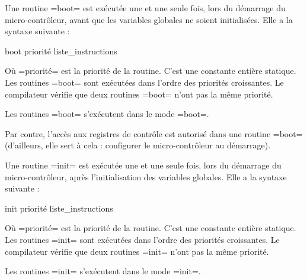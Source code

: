 
Une routine \plm=boot= est exécutée une et une seule fois, lors du démarrage du micro-contrôleur, avant que les variables globales ne soient initialisées. Elle a la syntaxe suivante :
\begin{PLM}
boot priorité {
  liste_instructions
}
\end{PLM}
Où \plm=priorité= est la priorité de la routine. C'est une constante entière statique. Les routines \plm=boot= sont exécutées dans l'ordre des priorités croissantes. Le compilateur vérifie que deux routines \plm=boot= n'ont pas la même priorité.

Les routines \plm=boot= s'exécutent dans le mode \plm=boot=.


Par contre, l'accès aux registres de contrôle est autorisé dans une routine \plm=boot= (d'ailleurs, elle sert à cela : configurer le micro-contrôleur au démarrage).








Une routine \plm=init= est exécutée une et une seule fois, lors du démarrage du micro-contrôleur, après l'initialisation des variables globales. Elle a la syntaxe suivante :
\begin{PLM}
init priorité {
  liste_instructions
}
\end{PLM}
Où \plm=priorité= est la priorité de la routine. C'est une constante entière statique. Les routines \plm=init= sont exécutées dans l'ordre des priorités croissantes. Le compilateur vérifie que deux routines \plm=init= n'ont pas la même priorité.

Les routines \plm=init= s'exécutent dans le mode \plm=init=.


















